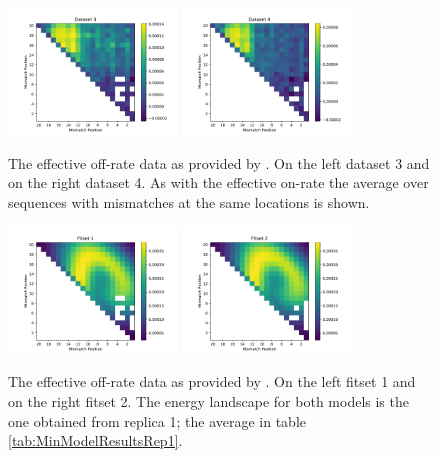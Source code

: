 \begin{figure}
\begin{center}
\includegraphics[width=0.4\textwidth]{images/OffRateDataset3}
\includegraphics[width=0.4\textwidth]{images/OffRateDataset4}
\caption{The effective off-rate data as provided by \cite{PNAS}. On the left dataset 3 and on the right dataset 4. As with the effective on-rate the average over sequences with mismatches at the same locations is shown.}
\label{fig:OffRateDataHM}
\end{center}
\end{figure}

\begin{figure}
\begin{center}
\includegraphics[width=0.4\textwidth]{images/OffRateFitset1}
\includegraphics[width=0.4\textwidth]{images/OffRateFitset2}
\caption{The effective off-rate data as provided by \cite{PNAS}. On the left fitset 1 and on the right fitset 2. The energy landscape for both models is the one obtained from replica 1; the average in table \ref{tab:MinModelResultsRep1}.}
\label{fig:OffRateFitHM}
\end{center}
\end{figure}


